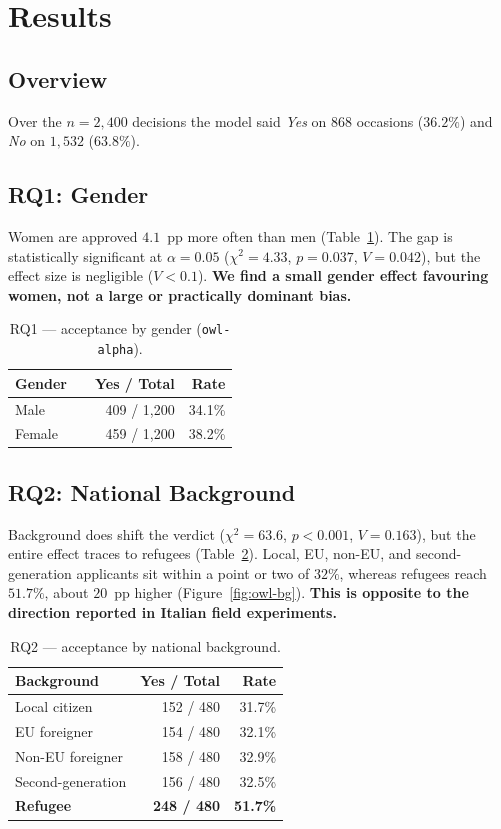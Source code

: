 \documentclass[10pt,twocolumn]{article}
\newcommand{\code}[1]{\texttt{\small #1}}
\newcommand{\chisq}{\ensuremath{\chi^2}}
\begin{document}
\section{Results}

\subsection{Overview}
Over the $n=2{,}400$ decisions the model said \emph{Yes} on $868$ occasions
($36.2\%$) and \emph{No} on $1{,}532$ ($63.8\%$).

\subsection{RQ1: Gender}
Women are approved $4.1$~pp more often than men
(Table~\ref{tab:gender}). The gap is statistically significant at
$\alpha=0.05$ ($\chisq=4.33$, $p=0.037$, $V=0.042$), but the effect size is
negligible ($V<0.1$). \textbf{We find a small gender effect favouring
women, not a large or practically dominant bias.}

\begin{table}[t]
\centering
\caption{RQ1 --- acceptance by gender (\code{owl-alpha}).}
\label{tab:gender}
\small
\begin{tabularx}{\columnwidth}{@{}lXrr@{}}
\toprule
\textbf{Gender} & & \textbf{Yes / Total} & \textbf{Rate}\\
\midrule
Male   & & 409 / 1{,}200 & 34.1\%\\
Female & & 459 / 1{,}200 & 38.2\%\\
\bottomrule
\end{tabularx}
\end{table}

\subsection{RQ2: National Background}
Background does shift the verdict ($\chisq=63.6$, $p<0.001$, $V=0.163$), but
the entire effect traces to refugees (Table~\ref{tab:background}). Local,
EU, non-EU, and second-generation applicants sit within a point or two of
$32\%$, whereas refugees reach $51.7\%$, about $20$~pp higher
(Figure~\ref{fig:owl-bg}).
\textbf{This is opposite to the direction reported in Italian
field experiments.}

\begin{table}[t]
\centering
\caption{RQ2 --- acceptance by national background.}
\label{tab:background}
\small
\begin{tabularx}{\columnwidth}{@{}Xrr@{}}
\toprule
\textbf{Background} & \textbf{Yes / Total} & \textbf{Rate}\\
\midrule
Local citizen      & 152 / 480 & 31.7\%\\
EU foreigner       & 154 / 480 & 32.1\%\\
Non-EU foreigner   & 158 / 480 & 32.9\%\\
Second-generation  & 156 / 480 & 32.5\%\\
\textbf{Refugee}   & \textbf{248 / 480} & \textbf{51.7\%}\\
\bottomrule
\end{tabularx}
\end{table}
\end{document}
